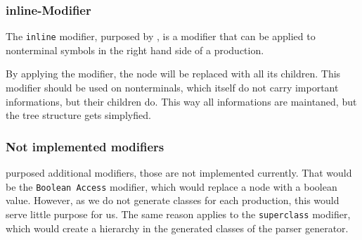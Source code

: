 \subsubsection{inline-Modifier}

The \verb|inline| modifier, purposed by \cite{GeneratingRewritableAST}, is a modifier that can be applied to nonterminal symbols in the right hand side of a production. 

By applying the modifier, the node will be replaced with all its children. This modifier should be used on nonterminals, which itself do not carry important informations, but their children do. This way all informations are maintaned, but the tree structure gets simplyfied.

\subsubsection{Not implemented modifiers}

\cite{GeneratingRewritableAST} purposed additional modifiers, those are not implemented currently. That would be the \verb|Boolean Access| modifier, which would replace a node with a boolean value. However, as we do not generate classes for each production, this would serve little purpose for us. The same reason applies to the \verb|superclass| modifier, which would create a hierarchy in the generated classes of the parser generator.
